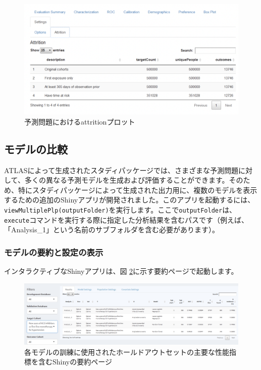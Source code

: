 \documentclass[
  11pt]{book}
\theoremstyle{definition}
\theoremstyle{definition}
\theoremstyle{definition}
\theoremstyle{definition}
\theoremstyle{remark}
\begin{document}
\begin{figure}

{\centering \includegraphics[width=1\linewidth]{images/PatientLevelPrediction/shiny/singleShiny/singleShinyAtt} 

}

\caption{予測問題におけるattritionプロット}\label{fig:shinyAtt}
\end{figure}

\subsection{モデルの比較}\label{ux30e2ux30c7ux30ebux306eux6bd4ux8f03}

ATLASによって生成されたスタディパッケージでは、さまざまな予測問題に対して、多くの異なる予測モデルを生成および評価することができます。そのため、特にスタディパッケージによって生成された出力用に、複数のモデルを表示するための追加のShinyアプリが開発されました。このアプリを起動するには、\texttt{viewMultiplePlp(outputFolder)}を実行します。ここで\texttt{outputFolder}は、\texttt{execute}コマンドを実行する際に指定した分析結果を含むパスです（例えば、「Analysis\_1」という名前のサブフォルダを含む必要があります）。

\subsubsection*{モデルの要約と設定の表示}\label{ux30e2ux30c7ux30ebux306eux8981ux7d04ux3068ux8a2dux5b9aux306eux8868ux793a}

インタラクティブなShinyアプリは、図 \ref{fig:multiShinySummary}に示す要約ページで起動します。

\begin{figure}

{\centering \includegraphics[width=1\linewidth]{images/PatientLevelPrediction/shiny/shinyFilter} 

}

\caption{各モデルの訓練に使用されたホールドアウトセットの主要な性能指標を含むShinyの要約ページ}\label{fig:multiShinySummary}
\end{figure}
\end{document}
